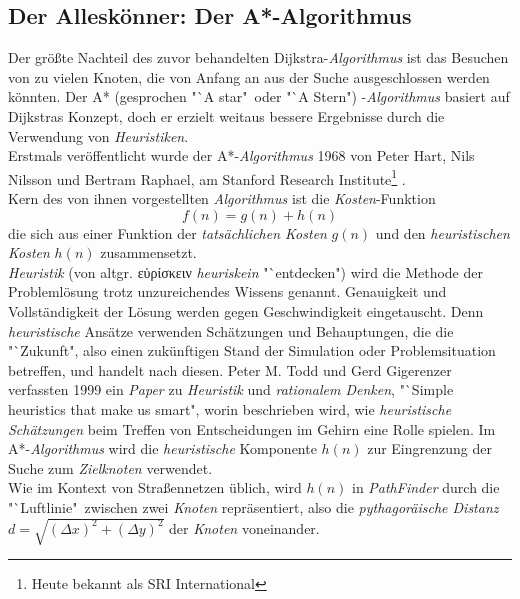 \documentclass[12pt]{article}
\begin{document}
\subsection{Der Alleskönner: Der A*-Algorithmus}
Der größte Nachteil des zuvor behandelten Dijkstra-\textit{Algorithmus} ist das Besuchen von zu vielen Knoten, die von Anfang an aus der Suche ausgeschlossen werden könnten. Der A* (gesprochen "`A star"\ oder "`A Stern") -\textit{Algorithmus} basiert auf Dijkstras Konzept, doch er erzielt weitaus bessere Ergebnisse durch die Verwendung von \textit{Heuristiken}.
\\
Erstmals veröffentlicht wurde der A*-\textit{Algorithmus} 1968 von Peter Hart, Nils Nilsson und Bertram Raphael, am Stanford Research Institute\footnote{Heute bekannt als SRI International} \cite{astar}.
\\
Kern des von ihnen vorgestellten \textit{Algorithmus} ist die \textit{Kosten}-Funktion
\[
f(n) = g(n) + h(n)
\]
die sich aus einer Funktion der \textit{tatsächlichen Kosten} $g(n)$ und den \textit{heuristischen Kosten} $h(n)$ zusammensetzt.
\\
\textit{Heuristik} (von altgr. \textgreek{εὑρίσκειν} \textit{heuriskein} "`entdecken") wird die Methode der Problemlösung trotz unzureichendes Wissens genannt. Genauigkeit und Vollständigkeit der Lösung werden gegen Geschwindigkeit eingetauscht. Denn \textit{heuristische} Ansätze verwenden Schätzungen und Behauptungen, die die "`Zukunft", also einen zukünftigen Stand der Simulation oder Problemsituation betreffen, und handelt nach diesen. Peter M. Todd und Gerd Gigerenzer verfassten 1999 ein \textit{Paper} zu \textit{Heuristik} und \textit{rationalem Denken}, "`Simple heuristics that make us smart"\cite{heuristics}, worin beschrieben wird, wie \textit{heuristische Schätzungen} beim Treffen von Entscheidungen im Gehirn eine Rolle spielen. Im A*-\textit{Algorithmus} wird die \textit{heuristische} Komponente $h(n)$ zur Eingrenzung der Suche zum \textit{Zielknoten} verwendet. 
\\
Wie im Kontext von Straßennetzen üblich, wird $h(n)$ in \textit{PathFinder} durch die "`Luftlinie"\ zwischen zwei \textit{Knoten} repräsentiert, also die \textit{pythagoräische Distanz} $d = \sqrt{(\Delta x)^2 + (\Delta y)^2}$ der \textit{Knoten} voneinander.
\label{sec:astar}
\end{document}
